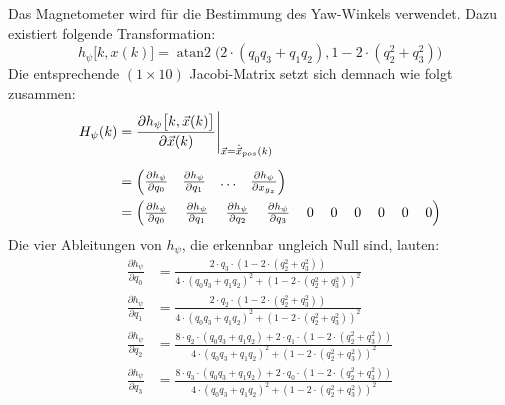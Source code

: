 \documentclass[12pt,a4paper]{article}
\DeclareMathOperator{\atantwo}{atan2} %
\newcommand{\PA}[2]{\frac{\partial #1}{\partial #2}}
\begin{document}
		Das Magnetometer wird für die Bestimmung des Yaw-Winkels verwendet. Dazu existiert folgende Transformation:
		\begin{equation}\label{eq:MessvorhersageMagnetometer}
			h_{\psi}\big[k,x(k)\big]=\atantwo\big(2\cdot (q_{0}q_{3}+q_{1}q_{2}), 1-2\cdot (q_{2}^{2}+q_{3}^{2})\big)
		\end{equation}
		Die entsprechende $(1\times 10)$ Jacobi-Matrix setzt sich demnach wie folgt zusammen:
		\begin{equation}
			\begin{split}
				H_{\psi}(k)&=\frac{\partial h_{\psi}\big[k,\vec{x}(k)\big]}{\partial \vec{x}(k)}\Bigg \vert_{\vec{x}=\hat{\vec{x}}_{pos}(k)}\\[0.5em]
				&=\begin{pmatrix}
				\PA{h_{\psi}}{q_{0}} & \PA{h_{\psi}}{q_{1}} & \ldots & \PA{h_{\psi}}{x_{g_{z}}}
				\end{pmatrix}\\
				&=
				\setlength{\arraycolsep}{6pt}
				\begin{pmatrix}
				\PA{h_{\psi}}{q_{0}} & \PA{h_{\psi}}{q_{1}} & \PA{h_{\psi}}{q_{2}} & \PA{h_{\psi}}{q_{3}} & 0 & 0 & 0 & 0 & 0 & 0
				\end{pmatrix}
			\end{split}
		\end{equation}
		Die vier Ableitungen von $h_{\psi}$, die erkennbar ungleich Null sind, lauten:
		\begin{align}\label{eq:AbleitungMessvorhersageMagnetometer}
			\PA{h_{\psi}}{q_{0}}&=\frac{2\cdot q_{3}\cdot (1-2\cdot (q_{2}^{2}+q_{3}^{2}))}{4\cdot (q_{0}q_{3}+q_{1}q_{2})^{2}+(1-2\cdot (q_{2}^{2}+q_{3}^{2}))^{2}}\\[0.5em]
			\PA{h_{\psi}}{q_{1}}&=\frac{2\cdot q_{2}\cdot (1-2\cdot (q_{2}^{2}+q_{3}^{2}))}{4\cdot (q_{0}q_{3}+q_{1}q_{2})^{2}+(1-2\cdot (q_{2}^{2}+q_{3}^{2}))^{2}}\\[0.5em]
			\PA{h_{\psi}}{q_{2}}&=\frac{8\cdot q_{2}\cdot (q_{0}q_{3}+q_{1}q_{2})+2\cdot q_{1}\cdot (1-2\cdot (q_{2}^{2}+q_{3}^{2}))}{4\cdot (q_{0}q_{3}+q_{1}q_{2})^{2}+(1-2\cdot (q_{2}^{2}+q_{3}^{2}))^{2}}\\[0.5em]
			\PA{h_{\psi}}{q_{3}}&=\frac{8\cdot q_{3}\cdot (q_{0}q_{3}+q_{1}q_{2})+2\cdot q_{0}\cdot (1-2\cdot (q_{2}^{2}+q_{3}^{2}))}{4\cdot (q_{0}q_{3}+q_{1}q_{2})^{2}+(1-2\cdot (q_{2}^{2}+q_{3}^{2}))^{2}}
		\end{align}
\end{document}
